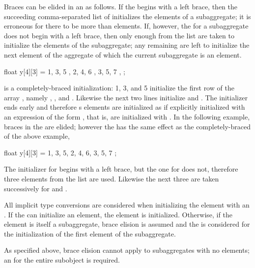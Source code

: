 \pnum
Braces can be elided in an
as follows.
If the
begins with a left brace,
then the succeeding comma-separated list of
initializes the elements of a subaggregate;
it is erroneous for there to be more
than elements.
If, however, the
for a subaggregate does not begin with a left brace,
then only enough
from the list are taken to initialize the elements of the subaggregate;
any remaining
are left to initialize the next element of the aggregate
of which the current subaggregate is an element.
\begin{example}
\begin{codeblock}
float y[4][3] = {
  { 1, 3, 5 },
  { 2, 4, 6 },
  { 3, 5, 7 },
};
\end{codeblock}
is a completely-braced initialization:
1, 3, and 5 initialize the first row of the array
,
namely
,
,
and
.
Likewise the next two lines initialize
and
.
The initializer ends early and therefore
s
elements are initialized as if explicitly initialized with an
expression of the form
,
that is, are initialized with
.
In the following example, braces in the
are elided;
however the
has the same effect as the completely-braced
of the above example,
\begin{codeblock}
float y[4][3] = {
  1, 3, 5, 2, 4, 6, 3, 5, 7
};
\end{codeblock}

The initializer for
begins with a left brace, but the one for
does not,
therefore three elements from the list are used.
Likewise the next three are taken successively for
and
.
\end{example}

\pnum
All implicit type conversions are considered when
initializing the element with an .
If the
can initialize an element, the element is initialized.
Otherwise, if the element is itself a subaggregate,
brace elision is assumed and the
is considered for the initialization of the first element of the subaggregate.
\begin{note}
As specified above, brace elision cannot apply to
subaggregates with no elements; an
 for the entire subobject is
required.
\end{note}

